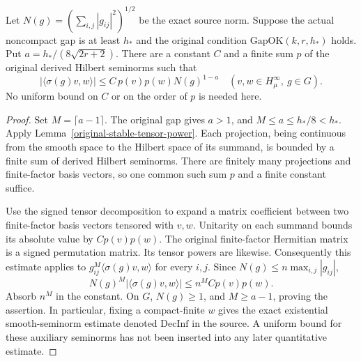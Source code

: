 \begin{theorem}\label{original-smooth-decay-from-tensor}
Let $N(g)=(\sum_{i,j}|g_{ij}|^2)^{1/2}$ be the exact source norm.
Suppose the actual noncompact gap is at least $h_*$ and the
original condition $\mathrm{GapOK}(k,r,h_*)$ holds. Put
$a=h_* /(8\sqrt{2r+2})$.
There are a constant $C$ and a finite sum $p$ of the original
derived Hilbert seminorms such that
\[
 |\langle\sigma(g)v,w\rangle|
 \le C\,p(v)p(w)N(g)^{1-a}
 \quad(v,w\in H_\mu^\infty,\ g\in G).
\]
No uniform bound on $C$ or on the order of $p$ is needed here.
\end{theorem}
\begin{proof}
Set $M=\lceil a-1\rceil$. The original gap gives $a>1$,
and $M\le a\le h_*/8<h_*$. Apply
Lemma~\ref{original-stable-tensor-power}.
Each projection, being continuous from the smooth space to the
Hilbert space of its summand, is bounded by a finite sum of
derived Hilbert seminorms. There are finitely many projections
and finite-factor basis vectors, so one common such sum $p$
and a finite constant suffice.

Use the signed tensor decomposition to expand a matrix coefficient
between two finite-factor basis vectors tensored with $v,w$.
Unitarity on each summand bounds its absolute value by
$Cp(v)p(w)$. The original finite-factor Hermitian matrix is a
signed permutation matrix. Its tensor powers are likewise.
Consequently this estimate applies to
$g_{ij}^M\langle\sigma(g)v,w\rangle$ for every $i,j$.
Since $N(g)\le n\max_{i,j}|g_{ij}|$,
\[
 N(g)^M|\langle\sigma(g)v,w\rangle|\le n^MCp(v)p(w).
\]
Absorb $n^M$ in the constant. On $G$, $N(g)\ge1$, and
$M\ge a-1$, proving the assertion.
In particular, fixing a compact-finite $w$ gives the exact
existential smooth-seminorm estimate denoted $\mathrm{DecInf}$
in the source. A uniform bound for these auxiliary seminorms
has not been inserted into any later quantitative estimate.
\end{proof}

